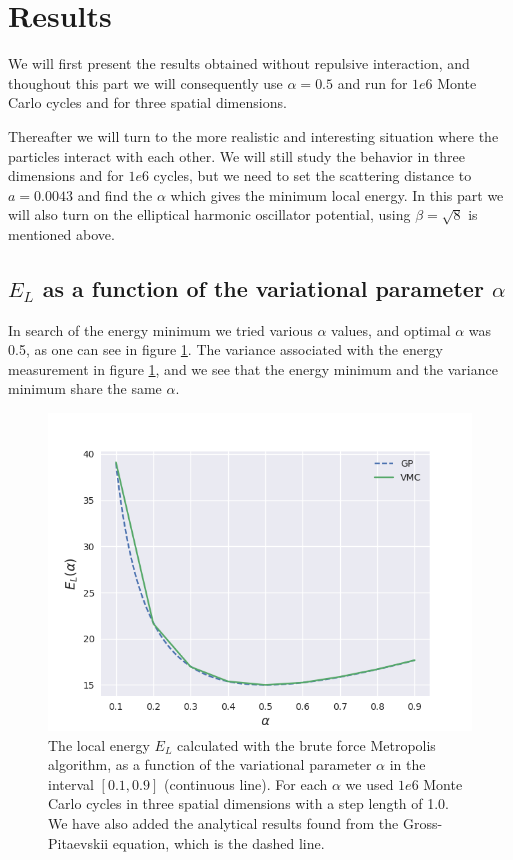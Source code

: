\documentclass[norsk,a4paper,12pt]{article}
\begin{document}
\section{Results} \label{Results}

We will first present the results obtained without repulsive interaction, and thoughout this part we will consequently use $\alpha=0.5$ and run for $1e6$ Monte Carlo cycles and for three spatial dimensions. 

Thereafter we will turn to the more realistic and interesting situation where the particles interact with each other. We will still study the behavior in three dimensions and for $1e6$ cycles, but we need to set the scattering distance to $a=0.0043$ and find the $\alpha$ which gives the minimum local energy. In this part we will also turn on the elliptical harmonic oscillator potential, using $\beta=\sqrt{8}$ is mentioned above.

\subsection{$E_L$ as a function of the variational parameter $\alpha$}
In search of the energy minimum we tried various $\alpha$ values, and optimal $\alpha$ was 0.5, as one can see in figure \ref{fig:EL_as_func_of_alpha}. The variance associated with the energy measurement in figure \ref{fig:EL_as_func_of_alpha}, and we see that the energy minimum and the variance minimum share the same $\alpha$.

\begin{figure} [H]
	\centering
	\includegraphics[scale=0.6]{images/energy.png}
	\caption{The local energy $E_L$ calculated with the brute force Metropolis algorithm, as a function of the variational parameter $\alpha$ in the interval $[0.1,0.9]$ (continuous line). For each $\alpha$ we used $1e6$ Monte Carlo cycles in three spatial dimensions with a step length of 1.0. We have also added the analytical results found from the Gross-Pitaevskii equation, which is the dashed line.}
	\label{fig:EL_as_func_of_alpha}
\end{figure} 
\end{document}
